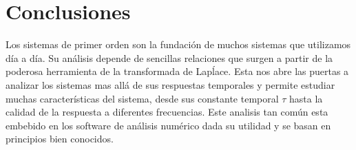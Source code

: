 \documentclass[letterpaper,11pt]{article}
\begin{document}
\section{Conclusiones}
	Los sistemas de primer orden son la fundación de muchos sistemas que utilizamos día a día. Su análisis depende de sencillas relaciones que surgen a partir de la poderosa herramienta de la transformada de Lapĺace. Esta nos abre las puertas a analizar los sistemas mas allá de sus respuestas temporales y permite estudiar muchas características del sistema, desde sus constante temporal $\tau$ hasta la calidad de la respuesta a diferentes frecuencias. Este analisis tan común esta embebido en los software de análisis numérico dada su utilidad y se basan en principios bien conocidos.
\end{document}
